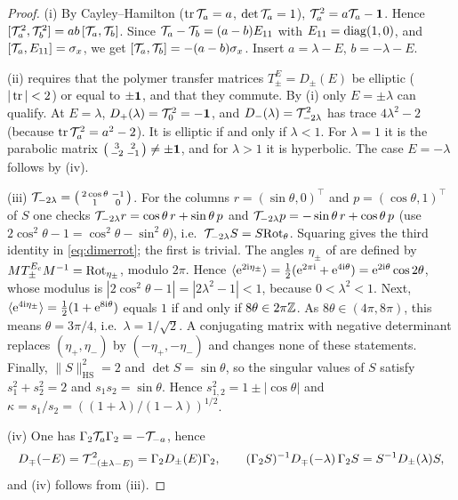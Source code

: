 \begin{proof}
(i) By Cayley--Hamilton ($\operatorname{tr}\mathcal{T}_a=a$, $\det\mathcal{T}_a=1$), $\mathcal{T}_a^2=a\mathcal{T}_a-\mathbf{1}$.  Hence
$[\mathcal{T}_a^2,\mathcal{T}_b^2]=ab\,[\mathcal{T}_a,\mathcal{T}_b]$.  Since $\mathcal{T}_a-\mathcal{T}_b=(a-b)E_{11}$ with
$E_{11}=\operatorname{diag}(1,0)$, and $[\mathcal{T}_a,E_{11}]=\sigma_x$, we get $[\mathcal{T}_a,\mathcal{T}_b]=-(a-b)\sigma_x$.  Insert
$a=\lambda-E$, $b=-\lambda-E$.

(ii) \cite[Def.~1]{JSBS2003} requires that the polymer transfer matrices $T^{E}_\pm=D_\pm(E)$ be elliptic
($|\operatorname{tr}|<2$) or equal to $\pm\mathbf{1}$, and that they commute.  By (i) only $E=\pm\lambda$ can qualify.  At
$E=\lambda$, $D_+(\lambda)=\mathcal{T}_0^2=-\mathbf{1}$, and $D_-(\lambda)=\mathcal{T}_{-2\lambda}^2$ has trace
$4\lambda^2-2$ (because $\operatorname{tr}\mathcal{T}_a^2=a^2-2$).  It is elliptic if and only if $\lambda<1$.  For
$\lambda=1$ it is the parabolic matrix $\bigl(\begin{smallmatrix}3&2\\-2&-1\end{smallmatrix}\bigr)\neq\pm\mathbf{1}$,
and for $\lambda>1$ it is hyperbolic.  The case $E=-\lambda$ follows by (iv).

(iii) $\mathcal{T}_{-2\lambda}=\bigl(\begin{smallmatrix}2\cos\theta&-1\\1&0\end{smallmatrix}\bigr)$.  For the columns
$r=(\sin\theta,0)^\top$ and $p=(\cos\theta,1)^\top$ of $S$ one checks
$\mathcal{T}_{-2\lambda}r=\cos\theta\,r+\sin\theta\,p$ and $\mathcal{T}_{-2\lambda}p=-\sin\theta\,r+\cos\theta\,p$
(use $2\cos^2\theta-1=\cos^2\theta-\sin^2\theta$), i.e.\ $\mathcal{T}_{-2\lambda}S=S\mathrm{Rot}_\theta$.  Squaring
gives the third identity in \eqref{eq:dimerrot}; the first is trivial.  The angles $\eta_\pm$ of
\cite[Eq.~(7)]{JSBS2003} are defined by $MT^{E_c}_\pm M^{-1}=\mathrm{Rot}_{\eta_\pm}$, modulo $2\pi$.  Hence
$\langle\mathrm{e}^{2\mathrm{i}\eta_\pm}\rangle=\frac12(\mathrm{e}^{2\pi\mathrm{i}}+\mathrm{e}^{4\mathrm{i}\theta})=\mathrm{e}^{2\mathrm{i}\theta}\cos2\theta$, whose
modulus is $|2\cos^2\theta-1|=|2\lambda^2-1|<1$, because $0<\lambda^2<1$.  Next,
$\langle\mathrm{e}^{4\mathrm{i}\eta_\pm}\rangle=\frac12(1+\mathrm{e}^{8\mathrm{i}\theta})$ equals $1$ if and only if $8\theta\in2\pi\mathbb{Z}$.  As
$8\theta\in(4\pi,8\pi)$, this means $\theta=3\pi/4$, i.e.\ $\lambda=1/\sqrt2$.  A conjugating matrix
with negative determinant replaces $(\eta_+,\eta_-)$ by $(-\eta_+,-\eta_-)$ and changes none of these
statements.  Finally, $\|S\|_{\mathrm{HS}}^2=2$ and $\det S=\sin\theta$, so the singular values of $S$
satisfy $s_1^2+s_2^2=2$ and $s_1s_2=\sin\theta$.  Hence $s_{1,2}^2=1\pm|\cos\theta|$ and
$\kappa=s_1/s_2=((1+\lambda)/(1-\lambda))^{1/2}$.

(iv) One has $\Gamma_2\mathcal{T}_a\Gamma_2=-\mathcal{T}_{-a}$, hence
\[
  D_\mp(-E)=\mathcal{T}_{-(\pm\lambda-E)}^2=\Gamma_2D_\pm(E)\Gamma_2,\qquad
  (\Gamma_2S)^{-1}D_\mp(-\lambda)\,\Gamma_2S=S^{-1}D_\pm(\lambda)S,
\]
and (iv) follows from (iii).
\end{proof}

